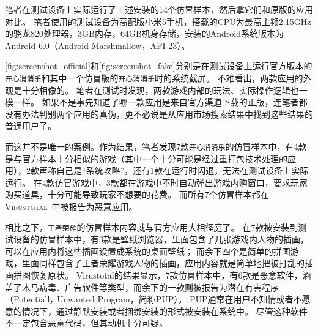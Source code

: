 笔者在测试设备上实际运行了上述安装的14个仿冒样本，然后拿它们和原版的应用对比。
笔者使用的测试设备为高配版小米5手机，搭载的CPU为最高主频2.15GHz的骁龙820处理器，3GB内存，64GB机身存储，安装的Android系统版本为Android 6.0（Android Marshmallow，API 23）。

\autoref{fig:screenshot_official}和\autoref{fig:screenshot_fake}分别是在测试设备上运行官方版本的\texttt{开心消消乐}和其中一个仿冒版的\texttt{开心消消乐}时的系统截屏。
不难看出，两款应用的外观是十分相像的。
笔者在测试时发现，两款游戏内部的玩法、实际操作逻辑也一模一样。
如果不是事先知道了哪一款应用是来自官方渠道下载的正版，连笔者都没有办法判别两个应用的真伪，更不必说是从应用市场搜索结果中找到这些结果的普通用户了。

而这并不是唯一的案例。作为结果，笔者发现7款\texttt{开心消消乐}的仿冒样本中，有4款是与官方样本十分相似的游戏（其中一个十分可能是经过重打包技术处理的应用），2款声称自己是``系统攻略''，还有1款在运行时闪退，无法在测试设备上实际运行。
在4款仿冒游戏中，3款都在游戏中不时自动弹出游戏内购窗口，要求玩家购买道具，十分可能导致玩家不想要的花费。
而所有7个仿冒样本都在\textsc{Virustotal}~\cite{virustotal}中被报告为恶意应用。

相比之下，\texttt{王者荣耀}的仿冒样本内容就与官方应用大相径庭了。
在7款被安装到测试设备的仿冒样本中，有3款是壁纸浏览器，里面包含了几张游戏内人物的插画，可以在应用内将这些插画设置成系统的桌面壁纸；
而余下四个是简单的拼图游戏，里面同样包含了王者荣耀游戏人物的插画，应用内容就是简单地把被打乱的插画拼图恢复原状。
Virustotal的结果显示，7款仿冒样本中，有6款是恶意软件，涵盖了木马病毒、广告软件等类型，而余下的一款则被报告为潜在有害程序（Potentially Unwanted Program，简称PUP）。
PUP通常在用户不知情或者不愿意的情况下，通过静默安装或者捆绑安装的形式被安装在系统中。
尽管这种软件不一定包含恶意代码，但其动机十分可疑。

